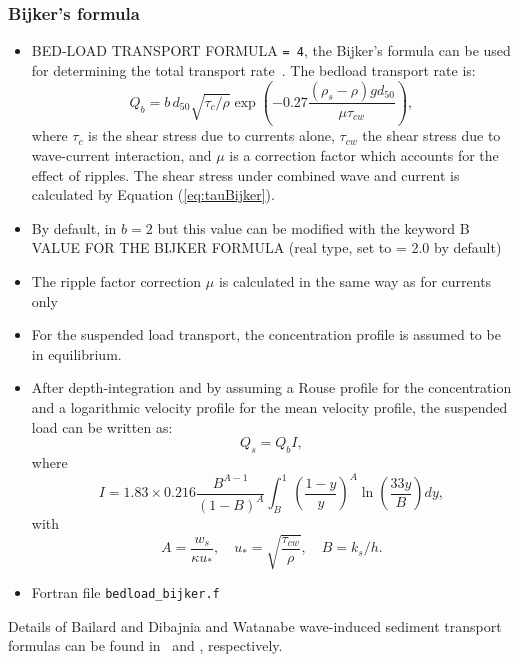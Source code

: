 \subsubsection{Bijker's formula}
\begin{itemize}
\item {\ttfamily BED-LOAD TRANSPORT FORMULA} \texttt{= 4}, the Bijker's formula can be used for determining the total transport rate~\cite{Bijker}. The bedload transport rate is:
\begin{equation*}
Q_b = b\,d_{50}\sqrt{\tau_c/\rho}\exp\left(-0.27\frac{(\rho_s-\rho)gd_{50}}{\mu \tau_{cw}}\right),
\end{equation*}
where $\tau_c$ is the shear stress due to currents alone, $\tau_{cw}$ the shear stress due to wave-current
interaction, and $\mu$ is a correction factor which accounts for the effect of ripples. The shear stress under combined wave and current is calculated
by Equation (\ref{eq:tauBijker}).
\item By default, in \sisyphe{} $b=2$ but this value can be modified with the keyword {\ttfamily B VALUE FOR THE BIJKER FORMULA} (real type, set to {\ttfamily = 2.0} by default)

\item The ripple factor correction $\mu$ is calculated in the same way as for currents only
  \item For the suspended load transport, the
concentration profile is assumed to be in equilibrium. 

\item After depth-integration and by assuming a Rouse profile for the concentration
and a logarithmic velocity profile for the mean velocity profile, the
suspended load can be written as:
\begin{equation*}
Q_{s} = Q_{b} I,
\end{equation*}
where 
\begin{equation*}
I=1.83\times 0.216\frac{B^{A-1}}{(1-B)^A} \int_B^1
\left(\frac{1-y}{y}\right)^A \ln\left(\frac{33y}{B}\right) d y, 
\end{equation*}
with  
\begin{equation*}
A = \frac{w_s}{\kappa u_*},\quad u_*=\sqrt{\frac{\tau_{cw}}{\rho}},\quad B = k_s/h.
\end{equation*}
\item Fortran file \texttt{bedload\_bijker.f}
\end{itemize}

Details of Bailard and Dibajnia and Watanabe wave-induced sediment transport formulas can be found in~\cite{Bailard} and \cite{Dibajnia}, respectively. 

